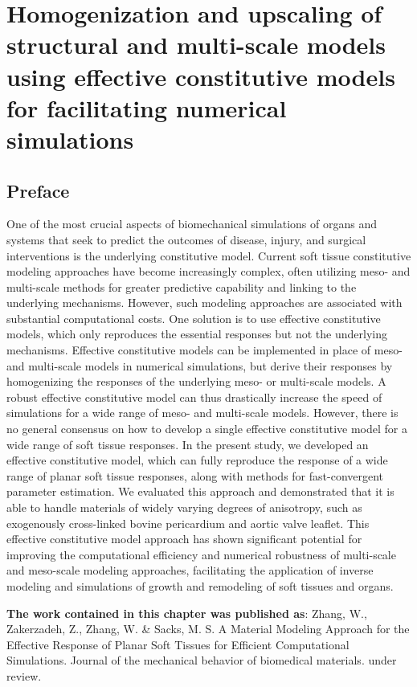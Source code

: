 \chapter{Homogenization and upscaling of structural and multi-scale models using effective constitutive models for facilitating numerical simulations}

\section*{Preface}
%

One of the most crucial aspects of biomechanical simulations of organs and systems that seek to predict the outcomes of disease, injury, and surgical interventions is the underlying constitutive model. Current soft tissue constitutive modeling approaches have become increasingly complex, often utilizing meso- and multi-scale methods for greater predictive capability and linking to the underlying mechanisms. However, such modeling approaches are associated with substantial computational costs. One solution is to use effective constitutive models, which only reproduces the essential responses but not the underlying mechanisms. Effective constitutive models can be implemented in place of meso- and multi-scale models in numerical simulations, but derive their responses by homogenizing the responses of the underlying meso- or multi-scale models. A robust effective constitutive model can thus drastically increase the speed of simulations for a wide range of meso- and multi-scale models. However, there is no general consensus on how to develop a single effective constitutive model for a wide range of soft tissue responses. In the present study, we developed an effective constitutive model, which can fully reproduce the response of a wide range of planar soft tissue responses, along with methods for fast-convergent parameter estimation. We evaluated this approach and demonstrated that it is able to handle materials of widely varying degrees of anisotropy, such as exogenously cross-linked bovine pericardium and aortic valve leaflet. This effective constitutive model approach has shown significant potential for improving the computational efficiency and numerical robustness of multi-scale and meso-scale modeling approaches, facilitating the application of inverse modeling and simulations of growth and remodeling of soft tissues and organs.

\textbf{The work contained in this chapter was published as}: Zhang, W., Zakerzadeh, Z., Zhang, W. \& Sacks, M. S.
A Material Modeling Approach for the Effective Response of Planar Soft Tissues for Efficient Computational Simulations. 
Journal of the mechanical behavior of biomedical materials. under review.



